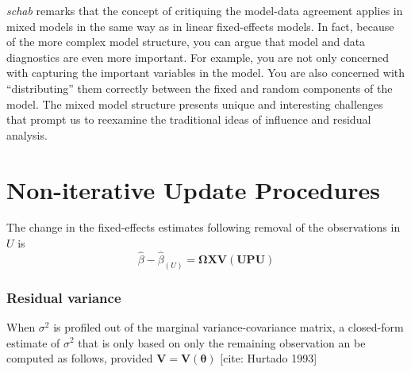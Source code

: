 \documentclass[12pt, a4paper]{report}
\theoremstyle{plain}
\theoremstyle{definition}
\theoremstyle{remark}
\begin{document}
\emph{schab} remarks that the concept of critiquing the model-data agreement applies in mixed models in the same way as in linear
fixed-effects models. In fact, because of the more complex model structure, you can argue that model and
data diagnostics are even more important. For example, you are not only concerned with capturing the
important variables in the model. You are also concerned with ``distributing” them correctly between the
fixed and random components of the model. The mixed model structure presents unique and interesting
challenges that prompt us to reexamine the traditional ideas of influence and residual analysis.

%	
%	
\section{Non-iterative Update Procedures}


The change in the fixed-effects estimates following removal of the observations in $U$ is
\[ \hat{\beta} - \hat{\beta}_{(U)} = \boldsymbol{\Omega}\boldsymbol{X}\boldsymbol{V}
\left( \boldsymbol{U} \boldsymbol{P}\boldsymbol{U}\right)   \]
\subsubsection{Residual variance}
When $\sigma^2$ is profiled out of the marginal variance-covariance matrix, a closed-form estimate of $\sigma^2$ that is only based on only the remaining observation
an be computed as follows, provided $\boldsymbol{V} = \boldsymbol{V}(\boldsymbol{\theta}) $
[cite: Hurtado 1993]
\end{document}
